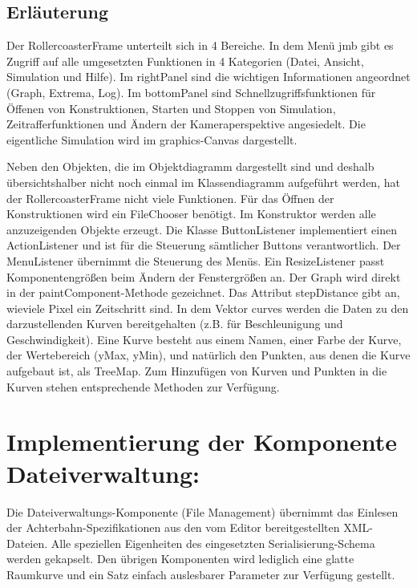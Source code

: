 \subsection{Erläuterung}

Der RollercoasterFrame unterteilt sich in 4 Bereiche. In dem Menü jmb gibt es Zugriff auf alle umgesetzten Funktionen in 4 Kategorien (Datei, Ansicht, Simulation und Hilfe). Im rightPanel sind die wichtigen Informationen angeordnet (Graph, Extrema, Log). Im bottomPanel sind Schnellzugriffsfunktionen für Öffenen von Konstruktionen, Starten und Stoppen von Simulation, Zeitrafferfunktionen und Ändern der Kameraperspektive angesiedelt. Die eigentliche Simulation wird im graphics-Canvas dargestellt.

Neben den Objekten, die im Objektdiagramm dargestellt sind und deshalb übersichtshalber nicht noch einmal im Klassendiagramm aufgeführt werden, hat der RollercoasterFrame nicht viele Funktionen. Für das Öffnen der Konstruktionen wird ein FileChooser benötigt. Im Konstruktor werden alle anzuzeigenden Objekte erzeugt. Die Klasse ButtonListener implementiert einen ActionListener und ist für die Steuerung sämtlicher Buttons verantwortlich. Der MenuListener übernimmt die Steuerung des Menüs. Ein ResizeListener passt Komponentengrößen beim Ändern der Fenstergrößen an.
Der Graph wird direkt in der paintComponent-Methode gezeichnet. Das Attribut stepDistance gibt an, wieviele Pixel ein Zeitschritt sind. In dem Vektor curves werden die Daten zu den darzustellenden Kurven bereitgehalten (z.B. für Beschleunigung und Geschwindigkeit). Eine Kurve besteht aus einem Namen, einer Farbe der Kurve, der Wertebereich (yMax, yMin), und natürlich den Punkten, aus denen die Kurve aufgebaut ist, als TreeMap. Zum Hinzufügen von Kurven und Punkten in die Kurven stehen entsprechende Methoden zur Verfügung.

\section{Implementierung der Komponente Dateiverwaltung:}

Die Dateiverwaltungs-Komponente (File Management) übernimmt das Einlesen der
Achterbahn-Spezifikationen aus den vom Editor bereitgestellten XML-Dateien. 
Alle speziellen Eigenheiten des eingesetzten Serialisierung-Schema werden gekapselt.
Den übrigen Komponenten wird lediglich eine glatte Raumkurve und ein Satz einfach 
auslesbarer Parameter zur Verfügung gestellt.

